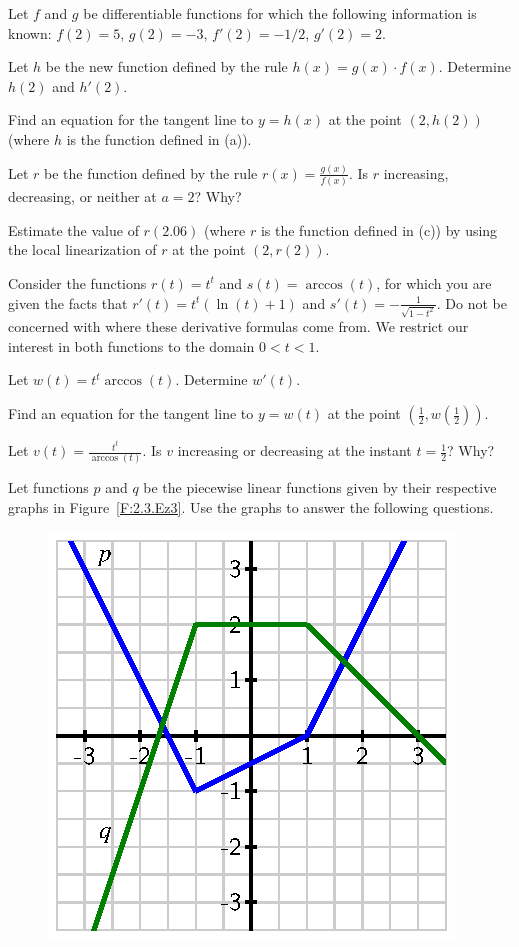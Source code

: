 \begin{exercises} 
\item Let $f$ and $g$ be differentiable functions for which the following information is known:  $f(2) = 5$, $g(2) = -3$, $f'(2) = -1/2$, $g'(2) = 2$.
\ba
	\item Let $h$ be the new function defined by the rule $h(x) = g(x) \cdot f(x)$.  Determine $h(2)$ and $h'(2)$.
	\item Find an equation for the tangent line to $y = h(x)$ at the point $(2,h(2))$ (where $h$ is the function defined in (a)).
	\item Let $r$ be the function defined by the rule $r(x) = \frac{g(x)}{f(x)}$.  Is $r$ increasing, decreasing, or neither at $a = 2$?  Why?
	\item Estimate the value of $r(2.06)$ (where $r$ is the function defined in (c)) by using the local linearization of $r$ at the point $(2,r(2))$.
\ea
\begin{exerciseSolution}
\end{exerciseSolution}
\item Consider the functions $r(t) = t^t$ and $s(t) = \arccos(t)$, for which you are given the facts that $r'(t) = t^t(\ln(t) + 1)$ and $s'(t) = -\frac{1}{\sqrt{1-t^2}}$.  Do not be concerned with where these derivative formulas come from.  We restrict our interest in both functions to the domain $0 < t < 1$.
\ba
	\item Let $w(t) = t^t \arccos(t)$.  Determine $w'(t)$.
	\item Find an equation for the tangent line to $y = w(t)$ at the point $(\frac{1}{2}, w(\frac{1}{2}))$.
	\item Let $v(t) = \frac{t^t}{\arccos(t)}$.  Is $v$ increasing or decreasing at the instant $t = \frac{1}{2}$?  Why?
\ea
\item Let functions $p$ and $q$ be the piecewise linear functions given by their respective graphs in Figure~\ref{F:2.3.Ez3}.  Use the graphs to answer the following questions.
\begin{figure}[h]
\begin{center}
\includegraphics{figures/2_1_Ez3.eps}

\end{center}
\end{figure}
\end{exercises}
